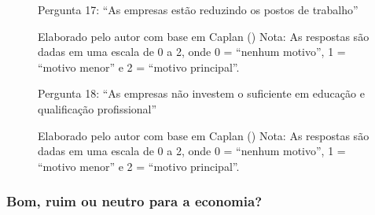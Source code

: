 \begin{figure}[H]
    \centering
    \caption*{Pergunta 17: “As empresas estão reduzindo os postos de trabalho”}
    \caption{Elaborado pelo autor com base em Caplan (\citeyear{The_Myth_of_the_Rational_Voter}) \newline
    Nota: As respostas são dadas em uma escala de 0 a 2, onde 0 = “nenhum motivo”, 1 = “motivo menor” e 2 = “motivo principal”.}
    \label{fig:pergunta_17}
\end{figure}

\begin{figure}[H]
    \centering
    \caption*{Pergunta 18: “As empresas não investem o suficiente em educação e qualificação profissional”}
    \caption{Elaborado pelo autor com base em Caplan (\citeyear{The_Myth_of_the_Rational_Voter}) \newline
    Nota: As respostas são dadas em uma escala de 0 a 2, onde 0 = “nenhum motivo”, 1 = “motivo menor” e 2 = “motivo principal”.}
    \label{fig:pergunta_18}
\end{figure}

\subsubsection{Bom, ruim ou neutro para a economia?}

